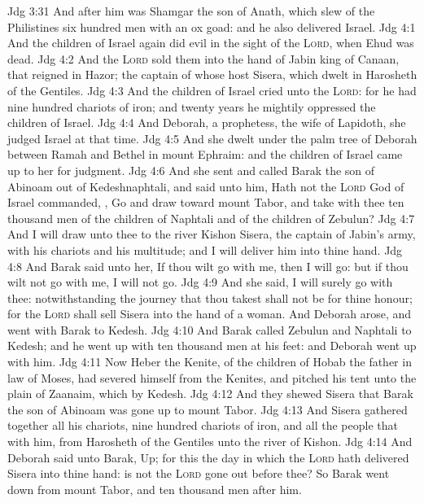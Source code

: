 \vs Jdg 3:31 And after him was Shamgar the son of Anath, which slew of the Philistines six hundred men with an ox goad: and he also delivered Israel.
\vs Jdg 4:1 And the children of Israel again did evil in the sight of the \textsc{Lord}, when Ehud was dead.
\vs Jdg 4:2 And the \textsc{Lord} sold them into the hand of Jabin king of Canaan, that reigned in Hazor; the captain of whose host  Sisera, which dwelt in Harosheth of the Gentiles.
\vs Jdg 4:3 And the children of Israel cried unto the \textsc{Lord}: for he had nine hundred chariots of iron; and twenty years he mightily oppressed the children of Israel.
\vs Jdg 4:4 And Deborah, a prophetess, the wife of Lapidoth, she judged Israel at that time.
\vs Jdg 4:5 And she dwelt under the palm tree of Deborah between Ramah and Bethel in mount Ephraim: and the children of Israel came up to her for judgment.
\vs Jdg 4:6 And she sent and called Barak the son of Abinoam out of Kedeshnaphtali, and said unto him, Hath not the \textsc{Lord} God of Israel commanded, , Go and draw toward mount Tabor, and take with thee ten thousand men of the children of Naphtali and of the children of Zebulun?
\vs Jdg 4:7 And I will draw unto thee to the river Kishon Sisera, the captain of Jabin's army, with his chariots and his multitude; and I will deliver him into thine hand.
\vs Jdg 4:8 And Barak said unto her, If thou wilt go with me, then I will go: but if thou wilt not go with me,  I will not go.
\vs Jdg 4:9 And she said, I will surely go with thee: notwithstanding the journey that thou takest shall not be for thine honour; for the \textsc{Lord} shall sell Sisera into the hand of a woman. And Deborah arose, and went with Barak to Kedesh.
\vs Jdg 4:10 And Barak called Zebulun and Naphtali to Kedesh; and he went up with ten thousand men at his feet: and Deborah went up with him.
\vs Jdg 4:11 Now Heber the Kenite,  of the children of Hobab the father in law of Moses, had severed himself from the Kenites, and pitched his tent unto the plain of Zaanaim, which  by Kedesh.
\vs Jdg 4:12 And they shewed Sisera that Barak the son of Abinoam was gone up to mount Tabor.
\vs Jdg 4:13 And Sisera gathered together all his chariots,  nine hundred chariots of iron, and all the people that  with him, from Harosheth of the Gentiles unto the river of Kishon.
\vs Jdg 4:14 And Deborah said unto Barak, Up; for this  the day in which the \textsc{Lord} hath delivered Sisera into thine hand: is not the \textsc{Lord} gone out before thee? So Barak went down from mount Tabor, and ten thousand men after him.
